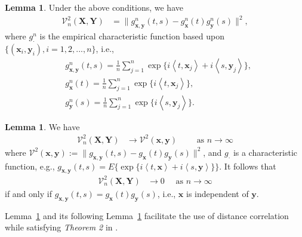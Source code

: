 \documentclass[12pt]{article}
\theoremstyle{definition}
\newtheorem{lemma}[theorem]{Lemma}
\begin{document}
\begin{lemma}
	\label{lemma1}
   Under the above conditions, we have 
	\begin{eqnarray*}
		\mathcal{V}^{2}_{n}(\mathbf{X},\mathbf{Y}) &= \|g_{\mathbf{x},\mathbf{y}}^{n}(t,s)-g_{\mathbf{x}}^{n}(t)g_{\mathbf{y}}^{n}(s)\|^{2},
	\end{eqnarray*}
	where $g_{\cdot}^{n}$ is the empirical characteristic function based upon $\{(\mathbf{x}_{i},\mathbf{y}_{i}), i=1,2,...,n\}$, i.e., 
	\begin{eqnarray*}
		&g_{\mathbf{x},\mathbf{y}}^{n}(t,s) = \frac{1}{n}\sum_{j=1}^{n}\exp\{i \left\langle t,\mathbf{x}_{j} \right\rangle  +i \left\langle  s,\mathbf{y}_{j}\right\rangle \}, \\
		&g_{\mathbf{x}}^{n}(t) = \frac{1}{n}\sum_{j=1}^{n}\exp\{i \left\langle t,\mathbf{x}_{j}\right\rangle\}, \\
		&g_{\mathbf{y}}^{n}(s) = \frac{1}{n}\sum_{j=1}^{n}\exp\{i \left\langle s,\mathbf{y}_{j}\right\rangle\}.
	\end{eqnarray*}
\end{lemma}

\begin{lemma}
	\label{lemma2}
We have 
	\begin{eqnarray}
		\mathcal{V}_{n}^{2}(\mathbf{X},\mathbf{Y}) &\longrightarrow \mathcal{V}^{2}(\mathbf{x},\mathbf{y}) \quad \quad \mbox{ as } n \rightarrow \infty
	\label{eq:conv1}
	\end{eqnarray}
where $\mathcal{V}^{2} (\mathbf{x},\mathbf{y}) := \| g_{\mathbf{x},\mathbf{y}}(t,s) - g_{\mathbf{x}}(t) g_{\mathbf{y}}(s) \|^2$, and $g_{\cdot}$ is a characteristic function, e.g., $g_{\mathbf{x},\mathbf{y}}(t,s) = E\{\exp\{i \left\langle t,\mathbf{x} \right\rangle  +i \left\langle  s,\mathbf{y}\right\rangle \}\}$.
	It follows that 
	\begin{eqnarray}
		\mathcal{V}_{n}^{2}(\mathbf{X},\mathbf{Y}) &\rightarrow 0 \quad \mbox{ as } n \rightarrow \infty
		\label{eq:conv2}
	\end{eqnarray}
	if and only if $g_{\mathbf{x},\mathbf{y}}(t,s) = g_{\mathbf{x}}(t) g_{\mathbf{y}}(s)$, i.e., $\mathbf{x}$ is independent of $\mathbf{y}$.
\end{lemma}
Lemma~\ref{lemma1} and its following Lemma~\ref{lemma2} facilitate the use of distance correlation while satisfying \textit{Theorem 2} in \cite{szekely2007measuring}.  
\end{document}
